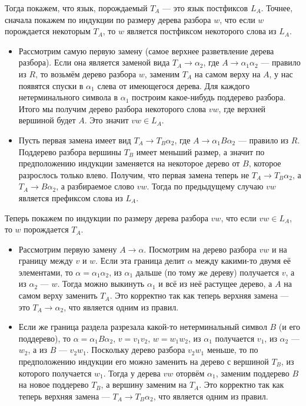 \documentclass[12pt,a4paper]{article}
\begin{document}
\begin{problem}{4}
        Тогда покажем, что язык, порождаемый $T_A$ --- это язык постфиксов $L_A$. Точнее, сначала покажем по индукции по размеру дерева разбора $w$, что если $w$ порождается некоторым $T_A$, то $w$ является постфиксом некоторого слова из $L_A$.
        \begin{itemize}
            \item Рассмотрим самую первую замену (самое верхнее разветвление дерева разбора). Если она является заменой вида $T_A \to \alpha_2$, где $A \to \alpha_1\alpha_2$ --- правило из $R$, то возьмём дерево разбора $w$, заменим $T_A$ на самом верху на $A$, у нас появятся спуски в $\alpha_1$ слева от имеющегося дерева. Для каждого нетерминального символа в $\alpha_1$ построим какое-нибудь поддерево разбора. Итого мы получим дерево разбора некоторого слова $vw$, где верхней вершиной будет $A$. Это значит $vw \in L_A$.
            \item Пусть первая замена имеет вид $T_A \to T_B \alpha_2$, где $A \to \alpha_1B\alpha_2$ --- правило из $R$. Поддерево разбора вершины $T_B$ имеет меньший размер, а значит по предположению индукции заменяется на некоторое дерево от $B$, которое разрослось только влево. Получим, что первая замена теперь не $T_A \to T_B \alpha_2$, а $T_A \to B \alpha_2$, а разбираемое слово $vw$. Тогда по предыдущему случаю $vw$ является префиксом слова из $L_A$. 
        \end{itemize}
        Теперь покажем по индукции по размеру дерева разбора $vw$, что если $vw \in L_A$, то $w$ порождается $T_A$.
        \begin{itemize}
            \item Рассмотрим первую замену $A \to \alpha$. Посмотрим на дерево разбора $vw$ и на границу между $v$ и $w$. Если эта граница делит $\alpha$ между какими-то двумя её элементами, то $\alpha = \alpha_1 \alpha_2$, из $\alpha_1$ дальше (по тому же дереву) получается $v$, а из $\alpha_2$ --- $w$. Тогда можно выкинуть $\alpha_1$ и всё из неё растущее дерево, а $A$ на самом верху заменить $T_A$. Это корректно так как теперь верхняя замена --- это $T_A \to \alpha_2$, что является одним из правил.
            \item Если же граница раздела разрезала какой-то нетерминальный символ $B$ (и его поддерево), то $\alpha = \alpha_1B\alpha_2$, $v = v_1v_2$, $w = w_1w_2$, из $\alpha_1$ получается $v_1$, из $\alpha_2$ --- $w_2$, а из $B$ --- $v_2 w_1$. Поскольку дерево разбора $v_2 w_1$ меньше, то по предположению индукции его можно заменить на дерево с вершиной $T_B$, из которого получается $w_1$. Тогда у дерева $vw$ оторвём $\alpha_1$, заменим поддерево $B$ на новое поддерево $T_B$, а вершину заменим на $T_A$. Это корректно так как теперь верхняя замена --- $T_A \to T_B \alpha_2$, что является одним из правил.
        \end{itemize}


\end{problem}
\end{document}
